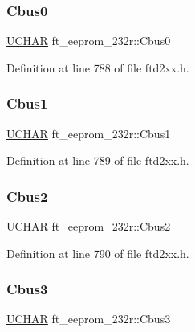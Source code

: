 \subsubsection{\texorpdfstring{Cbus0}{Cbus0}}
{\footnotesize\ttfamily \hyperlink{CatCaloProto40MHz_2inc_2WinTypes_8h_a4f4bb67531a9bf6f0b9c6ad76aeba587}{U\+C\+H\+AR} ft\+\_\+eeprom\+\_\+232r\+::\+Cbus0}



Definition at line 788 of file ftd2xx.\+h.

\mbox{\label{structft__eeprom__232r_aa0ed7fa40a23e6e17359c1fec9dc2677}} 
\subsubsection{\texorpdfstring{Cbus1}{Cbus1}}
{\footnotesize\ttfamily \hyperlink{CatCaloProto40MHz_2inc_2WinTypes_8h_a4f4bb67531a9bf6f0b9c6ad76aeba587}{U\+C\+H\+AR} ft\+\_\+eeprom\+\_\+232r\+::\+Cbus1}



Definition at line 789 of file ftd2xx.\+h.

\mbox{\label{structft__eeprom__232r_a697c610b8e23ae556274c34703fd0582}} 
\subsubsection{\texorpdfstring{Cbus2}{Cbus2}}
{\footnotesize\ttfamily \hyperlink{CatCaloProto40MHz_2inc_2WinTypes_8h_a4f4bb67531a9bf6f0b9c6ad76aeba587}{U\+C\+H\+AR} ft\+\_\+eeprom\+\_\+232r\+::\+Cbus2}



Definition at line 790 of file ftd2xx.\+h.

\mbox{\label{structft__eeprom__232r_af6c591aa67f0e9ff287da8af81f7399e}} 
\subsubsection{\texorpdfstring{Cbus3}{Cbus3}}
{\footnotesize\ttfamily \hyperlink{CatCaloProto40MHz_2inc_2WinTypes_8h_a4f4bb67531a9bf6f0b9c6ad76aeba587}{U\+C\+H\+AR} ft\+\_\+eeprom\+\_\+232r\+::\+Cbus3}




